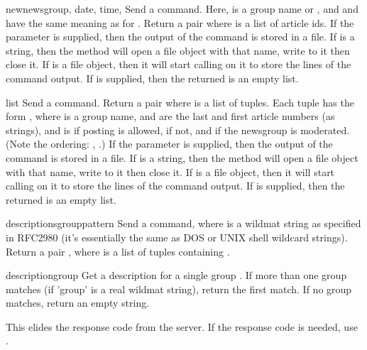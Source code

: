 \begin{methoddesc}{newnews}{group, date, time, }
Send a  command.  Here,  is a group name or
, and  and  have the same meaning as for
.  Return a pair  where  is a list of article ids.
If the  parameter is supplied, then the output of the 
 command is stored in a file.  If  is a string, 
then the method will open a file object with that name, write to it 
then close it.  If  is a file object, then it will start
calling  on it to store the lines of the command output.
If  is supplied, then the returned  is an empty list.
\end{methoddesc}

\begin{methoddesc}{list}{}
Send a  command.  Return a pair  where  is a list of tuples.  Each tuple has the
form , where
 is a group name,  and  are the last
and first article numbers (as strings), and  is
 if posting is allowed,  if not, and  if
the newsgroup is moderated.  (Note the ordering: ,
.)
If the  parameter is supplied, then the output of the 
 command is stored in a file.  If  is a string, 
then the method will open a file object with that name, write to it 
then close it.  If  is a file object, then it will start
calling  on it to store the lines of the command output.
If  is supplied, then the returned  is an empty list.
\end{methoddesc}

\begin{methoddesc}{descriptions}{grouppattern}
Send a  command, where  is a wildmat
string as specified in RFC2980 (it's essentially the same as DOS or UNIX
shell wildcard strings).  Return a pair , where  is a list of tuples containing
.

\end{methoddesc}

\begin{methoddesc}{description}{group}
Get a description for a single group .  If more than one group
matches (if 'group' is a real wildmat string), return the first match.  
If no group matches, return an empty string.

This elides the response code from the server.  If the response code is
needed, use .

\end{methoddesc}

